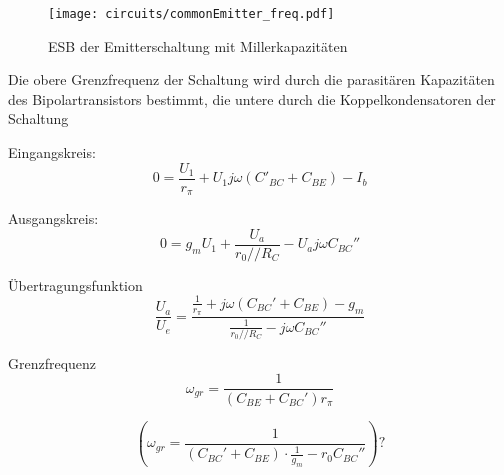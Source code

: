 \begin{figure}[H]
  \begin{center}
    \texttt{[image: circuits/commonEmitter\_freq.pdf]}
  \end{center}
  \caption{ESB der Emitterschaltung mit Millerkapazitäten}
\end{figure}

Die obere Grenzfrequenz der Schaltung wird durch die parasitären Kapazitäten des
Bipolartransistors bestimmt, die untere durch die Koppelkondensatoren der Schaltung

Eingangskreis:
\[0 = \frac{U_1}{r_\pi} + U_1 j \omega (C'_{BC}+C_{BE})-I_b\]

\noindent Ausgangskreis:
\[0 = g_m U_1 + \frac{U_a}{r_0 // R_C} - U_a j \omega C_{BC}''\]

\noindent Übertragungsfunktion
\[\frac{U_a}{U_e} = \frac{\frac{1}{r_\pi} +
    j\omega(C_{BC}'+C_{BE}) -g_m}{\frac{1}{r_0 // R_C} - j\omega C_{BC}''}\]

\noindent Grenzfrequenz
\[\omega_{gr} = \frac{1}{(C_{BE}+C_{BC}')r_\pi }\]

\[\left( \omega_{gr} = \frac{1}{(C_{BC}' + C_{BE})\cdot \frac{1}{g_m} - r_0
      C_{BC}''} \right) ? \]